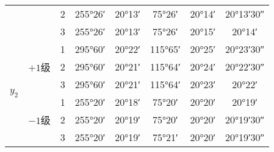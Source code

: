 \documentclass[a4paper]{article}
\begin{document}
\begin{table}[htbp]
{\begin{tabular}{cccccccc}
			                                           &                         & 2                  & \ang{255;26;}                  & \ang{20;13;}                                & \ang{75;26;}                   & \ang{20;14;}                                                        & \ang{20;13;30}                                             \\
			                                           &                         & 3                  & \ang{255;26;}                  & \ang{20;13;}                                & \ang{75;26;}                   & \ang{20;15;}                                                        & \ang{20;14;}                                               \\\hline
			\multirow{6}{*}{$y_2$}                     & \multirow{3}{*}{$+1$级} & 1                  & \ang{295;60;}                  & \ang{20;22;}                                & \ang{115;65;}                  & \ang{20;25;}                                                        & \ang{20;23;30}                                             \\
			                                           &                         & 2                  & \ang{295;60;}                  & \ang{20;21;}                                & \ang{115;64;}                  & \ang{20;24;}                                                        & \ang{20;22;30}                                             \\
			                                           &                         & 3                  & \ang{295;60;}                  & \ang{20;21;}                                & \ang{115;64;}                  & \ang{20;23;}                                                        & \ang{20;22;}                                               \\
			                                           & \multirow{3}{*}{$-1$级} & 1                  & \ang{255;20;}                  & \ang{20;18;}                                & \ang{75;20;}                   & \ang{20;20;}                                                        & \ang{20;19;}                                               \\
			                                           &                         & 2                  & \ang{255;20;}                  & \ang{20;19;}                                & \ang{75;20;}                   & \ang{20;20;}                                                        & \ang{20;19;30}                                             \\
			                                           &                         & 3                  & \ang{255;20;}                  & \ang{20;19;}                                & \ang{75;21;}                   & \ang{20;20;}                                                        & \ang{20;19;30}                                             \\\hline\hline
		\end{tabular}}
\end{table}\par
\end{document}
